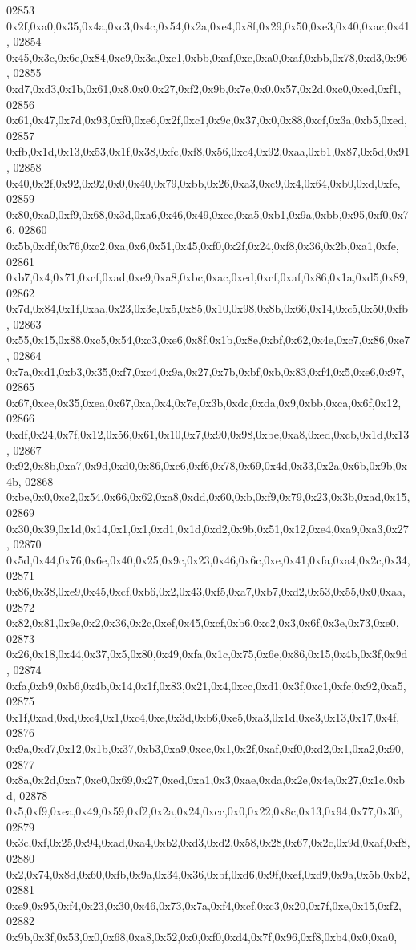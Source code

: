 \begin{DoxyCode}
02853   0x2f,0xa0,0x35,0x4a,0xc3,0x4c,0x54,0x2a,0xe4,0x8f,0x29,0x50,0xe3,0x40,0xac,0x41,
02854   0x45,0x3c,0x6e,0x84,0xe9,0x3a,0xc1,0xbb,0xaf,0xe,0xa0,0xaf,0xbb,0x78,0xd3,0x96,
02855   0xd7,0xd3,0x1b,0x61,0x8,0x0,0x27,0xf2,0x9b,0x7e,0x0,0x57,0x2d,0xc0,0xed,0xf1,
02856   0x61,0x47,0x7d,0x93,0xf0,0xe6,0x2f,0xc1,0x9c,0x37,0x0,0x88,0xcf,0x3a,0xb5,0xed,
02857   0xfb,0x1d,0x13,0x53,0x1f,0x38,0xfc,0xf8,0x56,0xc4,0x92,0xaa,0xb1,0x87,0x5d,0x91,
02858   0x40,0x2f,0x92,0x92,0x0,0x40,0x79,0xbb,0x26,0xa3,0xc9,0x4,0x64,0xb0,0xd,0xfe,
02859   0x80,0xa0,0xf9,0x68,0x3d,0xa6,0x46,0x49,0xce,0xa5,0xb1,0x9a,0xbb,0x95,0xf0,0x76,
02860   0x5b,0xdf,0x76,0xc2,0xa,0x6,0x51,0x45,0xf0,0x2f,0x24,0xf8,0x36,0x2b,0xa1,0xfe,
02861   0xb7,0x4,0x71,0xcf,0xad,0xe9,0xa8,0xbc,0xac,0xed,0xcf,0xaf,0x86,0x1a,0xd5,0x89,
02862   0x7d,0x84,0x1f,0xaa,0x23,0x3e,0x5,0x85,0x10,0x98,0x8b,0x66,0x14,0xc5,0x50,0xfb,
02863   0x55,0x15,0x88,0xc5,0x54,0xc3,0xe6,0x8f,0x1b,0x8e,0xbf,0x62,0x4e,0xc7,0x86,0xe7,
02864   0x7a,0xd1,0xb3,0x35,0xf7,0xc4,0x9a,0x27,0x7b,0xbf,0xb,0x83,0xf4,0x5,0xe6,0x97,
02865   0x67,0xce,0x35,0xea,0x67,0xa,0x4,0x7e,0x3b,0xdc,0xda,0x9,0xbb,0xca,0x6f,0x12,
02866   0xdf,0x24,0x7f,0x12,0x56,0x61,0x10,0x7,0x90,0x98,0xbe,0xa8,0xed,0xcb,0x1d,0x13,
02867   0x92,0x8b,0xa7,0x9d,0xd0,0x86,0xc6,0xf6,0x78,0x69,0x4d,0x33,0x2a,0x6b,0x9b,0x4b,
02868   0xbe,0x0,0xc2,0x54,0x66,0x62,0xa8,0xdd,0x60,0xb,0xf9,0x79,0x23,0x3b,0xad,0x15,
02869   0x30,0x39,0x1d,0x14,0x1,0x1,0xd1,0x1d,0xd2,0x9b,0x51,0x12,0xe4,0xa9,0xa3,0x27,
02870   0x5d,0x44,0x76,0x6e,0x40,0x25,0x9c,0x23,0x46,0x6c,0xe,0x41,0xfa,0xa4,0x2c,0x34,
02871   0x86,0x38,0xe9,0x45,0xcf,0xb6,0x2,0x43,0xf5,0xa7,0xb7,0xd2,0x53,0x55,0x0,0xaa,
02872   0x82,0x81,0x9e,0x2,0x36,0x2c,0xef,0x45,0xcf,0xb6,0xc2,0x3,0x6f,0x3e,0x73,0xe0,
02873   0x26,0x18,0x44,0x37,0x5,0x80,0x49,0xfa,0x1c,0x75,0x6e,0x86,0x15,0x4b,0x3f,0x9d,
02874   0xfa,0xb9,0xb6,0x4b,0x14,0x1f,0x83,0x21,0x4,0xcc,0xd1,0x3f,0xc1,0xfc,0x92,0xa5,
02875   0x1f,0xad,0xd,0xc4,0x1,0xc4,0xe,0x3d,0xb6,0xe5,0xa3,0x1d,0xe3,0x13,0x17,0x4f,
02876   0x9a,0xd7,0x12,0x1b,0x37,0xb3,0xa9,0xec,0x1,0x2f,0xaf,0xf0,0xd2,0x1,0xa2,0x90,
02877   0x8a,0x2d,0xa7,0xc0,0x69,0x27,0xed,0xa1,0x3,0xae,0xda,0x2e,0x4e,0x27,0x1c,0xbd,
02878   0x5,0xf9,0xea,0x49,0x59,0xf2,0x2a,0x24,0xcc,0x0,0x22,0x8c,0x13,0x94,0x77,0x30,
02879   0x3c,0xf,0x25,0x94,0xad,0xa4,0xb2,0xd3,0xd2,0x58,0x28,0x67,0x2c,0x9d,0xaf,0xf8,
02880   0x2,0x74,0x8d,0x60,0xfb,0x9a,0x34,0x36,0xbf,0xd6,0x9f,0xef,0xd9,0x9a,0x5b,0xb2,
02881   0xe9,0x95,0xf4,0x23,0x30,0x46,0x73,0x7a,0xf4,0xcf,0xc3,0x20,0x7f,0xe,0x15,0xf2,
02882   0x9b,0x3f,0x53,0x0,0x68,0xa8,0x52,0x0,0xf0,0xd4,0x7f,0x96,0xf8,0xb4,0x0,0xa0,

\end{DoxyCode}
